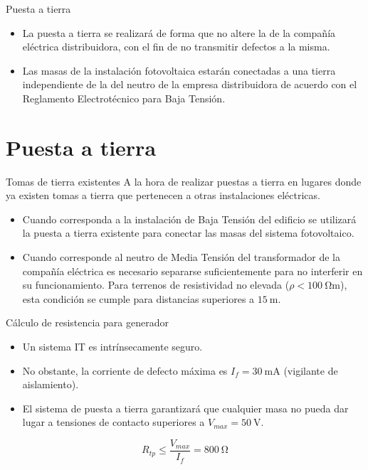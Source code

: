 \documentclass[aspectratio=169, usenames,svgnames,dvipsnames]{beamer}
\begin{document}
\begin{frame}[label={sec:org2c8e665}]{Puesta a tierra}
\begin{itemize}
\item \alert{La puesta a tierra} se realizará de forma que \alert{no altere la de la
compañía eléctrica distribuidora}, con el fin de no transmitir
defectos a la misma.

\item \alert{Las masas de la instalación fotovoltaica estarán conectadas a una
tierra independiente de la del neutro} de la empresa distribuidora
de acuerdo con el Reglamento Electrotécnico para Baja Tensión.
\end{itemize}
\end{frame}


\section{Puesta a tierra}
\label{sec:org79d94e0}

\begin{frame}[label={sec:org9d9d874}]{Tomas de tierra existentes}
A la hora de realizar puestas a tierra en lugares donde ya existen
tomas a tierra que pertenecen a otras instalaciones eléctricas.

\begin{itemize}
\item Cuando corresponda a la \alert{instalación de Baja Tensión del edificio}
\alert{se utilizará la puesta a tierra existente} para conectar las masas
del sistema fotovoltaico.

\item Cuando corresponde al \alert{neutro de Media Tensión del transformador de
la compañía eléctrica} es necesario \alert{separarse suficientemente} para
no interferir en su funcionamiento. Para terrenos de resistividad no
elevada (\(\rho<\SI{100}{\ohm\meter}\)), esta condición se cumple para
distancias superiores a \(\SI{15}{\meter}\).
\end{itemize}
\end{frame}


\begin{frame}[label={sec:org73847f6}]{Cálculo de resistencia para generador}
\begin{itemize}
\item Un sistema IT es intrínsecamente seguro.
\item No obstante, la corriente de defecto máxima es \(I_f=\SI{30}{\milli\ampere}\) (vigilante de aislamiento).
\item El sistema de puesta a tierra garantizará que cualquier masa no pueda dar lugar a tensiones de contacto superiores a \(V_{max}=\SI{50}{\volt}\).
\end{itemize}

$$R_{tp}\leq\frac{V_{max}}{I_{f}} = \qty{800}{\ohm}$$
\end{frame}
\end{document}
